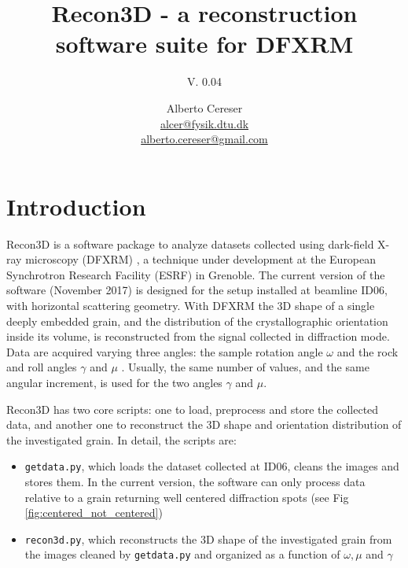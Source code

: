 \documentclass[11pt]{scrartcl}
\begin{document}
%
\author{Alberto Cereser\\
\href{mailto:alcer@fysik.dtu.dk}{alcer@fysik.dtu.dk}\\
\href{mailto:alberto.cereser@gmail.com}{alberto.cereser@gmail.com}}
\title{Recon3D - a reconstruction software suite for DFXRM}
\subtitle{V. 0.04}
\maketitle

\tableofcontents

\section{Introduction}

Recon3D is a software package to analyze datasets collected using dark-field X-ray microscopy ({\footnotesize{DFXRM}}) {\cite{dfxrm_nat_comm}}, a technique under development at the European Synchrotron Research Facility ({\footnotesize{ESRF}}) in Grenoble. The current version of the software (November 2017) is designed for the setup installed at beamline {\footnotesize{ID06}}, with horizontal scattering geometry. With {\footnotesize{DFXRM}} the {\footnotesize{3D}} shape of a single deeply embedded grain, and the distribution of the crystallographic orientation inside its volume, is reconstructed from the signal collected in diffraction mode. Data are acquired varying three angles: the sample rotation angle $\omega$ and the rock and roll angles $\gamma$ and $\mu$ \cite{henning_joac}. Usually, the same number of values, and the same angular increment, is used for the two angles $\gamma$ and $\mu$.

Recon3D has two core scripts: one to load, preprocess and store the collected data, and another one to reconstruct the {\footnotesize{3D}} shape and orientation distribution of the investigated grain. In detail, the scripts are:
\begin{itemize}
    \item {\texttt{getdata.py}}, which loads the dataset collected at {\footnotesize{ID06}}, cleans the images and stores them. In the current version, the software can only process data relative to a grain returning well centered diffraction spots (see Fig \ref{fig:centered_not_centered})
    \item {\texttt{recon3d.py}}, which reconstructs the {\footnotesize{3D}} shape of the investigated grain from the images cleaned by {\texttt{getdata.py}} and organized as a function of $\omega, \mu$ and $\gamma$
\end{itemize}
\end{document}
